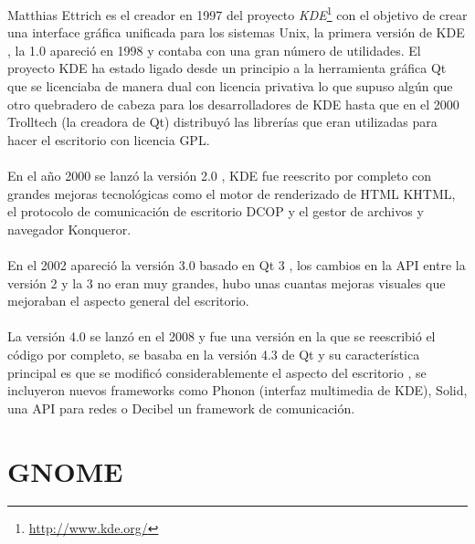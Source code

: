 \documentclass[a4paper,oneside,11pt]{article}
\begin{document}
Matthias Ettrich es el creador en 1997 del proyecto \emph{KDE}\footnote{\url{http://www.kde.org/}} con el objetivo de crear una interface gr\'afica 
unificada para los sistemas Unix, la primera versi\'on de KDE , la 1.0 apareci\'o en 1998 y contaba con
una gran n\'umero de utilidades. El proyecto KDE ha estado ligado desde un principio a la herramienta
gr\'afica Qt que se licenciaba de manera dual con licencia privativa lo que supuso alg\'un que otro
quebradero de cabeza para los desarrolladores de KDE hasta que en el 2000 Trolltech (la creadora de Qt) 
distribuy\'o las librer\'ias que eran utilizadas para hacer el escritorio con licencia GPL.
\\\\
En el año 2000 se lanz\'o la versi\'on 2.0 , KDE fue reescrito por completo con grandes mejoras tecnol\'ogicas
como el motor de renderizado de HTML KHTML, el protocolo de comunicaci\'on de escritorio DCOP y el gestor de archivos
y navegador Konqueror.
\\\\
En el 2002 apareci\'o la versi\'on 3.0 basado en Qt 3 , los cambios en la API entre la versi\'on 2 y la 3
no eran muy grandes, hubo unas cuantas mejoras visuales que mejoraban el aspecto general del escritorio.
\\\\
La versi\'on 4.0 se lanz\'o en el 2008 y fue una versi\'on en la que se reescribi\'o el c\'odigo por completo,
se basaba en la versi\'on 4.3 de Qt y su caracter\'istica principal es que se modific\'o considerablemente el
aspecto del escritorio , se incluyeron nuevos frameworks como Phonon (interfaz multimedia de KDE), Solid, una
API para redes o Decibel un framework de comunicaci\'on.

\section{GNOME}
\end{document}
